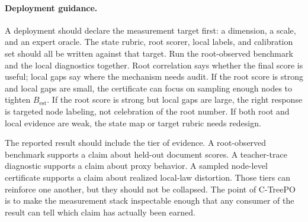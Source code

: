 \paragraph{Deployment guidance.}
A deployment should declare the measurement target first: a
dimension, a scale, and an expert oracle. The state rubric, root
scorer, local labels, and calibration set should all be written
against that target. Run the root-observed benchmark and the local
diagnostics together. Root correlation says whether the final
score is useful; local gaps say where the mechanism needs audit.
If the root score is strong and local gaps are small, the
certificate can focus on sampling enough nodes to tighten
\(B_{\mathrm{est}}\). If the root score is strong but local gaps
are large, the right response is targeted node labeling, not
celebration of the root number. If both root and local evidence
are weak, the state map or target rubric needs redesign.

The reported result should include the tier of evidence. A
root-observed benchmark supports a claim about held-out document
scores. A teacher-trace diagnostic supports a claim about proxy
behavior. A sampled node-level certificate supports a claim about
realized local-law distortion. Those tiers can reinforce one
another, but they should not be collapsed. The point of C-TreePO
is to make the measurement stack inspectable enough that any
consumer of the result can tell which claim has actually been
earned.
